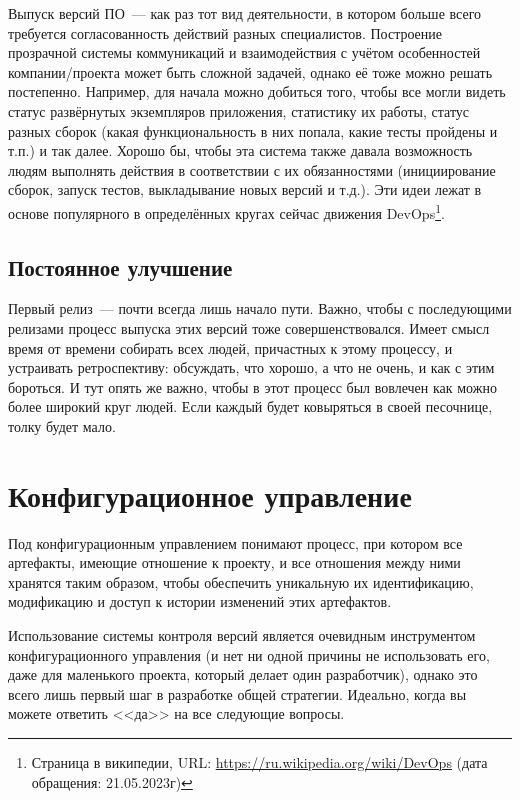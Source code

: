 \documentclass{../../text-style}
\begin{document}
Выпуск версий ПО~--- как раз тот вид деятельности, в котором больше всего требуется согласованность действий разных специалистов. Построение прозрачной системы коммуникаций и взаимодействия с учётом особенностей компании/проекта может быть сложной задачей, однако её тоже можно решать постепенно. Например, для начала можно добиться того, чтобы все могли видеть статус развёрнутых экземпляров приложения, статистику их работы, статус разных сборок (какая функциональность в них попала, какие тесты пройдены и т.п.) и так далее. Хорошо бы, чтобы эта система также давала возможность людям выполнять действия в соответствии с их обязанностями (инициирование сборок, запуск тестов, выкладывание новых версий и т.д.). Эти идеи лежат в основе популярного в определённых кругах сейчас движения DevOps\footnote{Страница в википедии, URL: \url{https://ru.wikipedia.org/wiki/DevOps} (дата обращения: 21.05.2023г)}.

\subsection{Постоянное улучшение}

Первый релиз~--- почти всегда лишь начало пути. Важно, чтобы с последующими релизами процесс выпуска этих версий тоже совершенствовался. Имеет смысл время от времени собирать всех людей, причастных к этому процессу, и устраивать ретроспективу: обсуждать, что хорошо, а что не очень, и как с этим бороться. И тут опять же важно, чтобы в этот процесс был вовлечен как можно более широкий круг людей. Если каждый будет ковыряться в своей песочнице, толку будет мало.

\section{Конфигурационное управление}

Под конфигурационным управлением понимают процесс, при котором все артефакты, имеющие отношение к проекту, и все отношения между ними хранятся таким образом, чтобы обеспечить уникальную их идентификацию, модификацию и доступ к истории изменений этих артефактов.

Использование системы контроля версий является очевидным инструментом конфигурационного управления (и нет ни одной причины не использовать его, даже для маленького проекта, который делает один разработчик), однако это всего лишь первый шаг в разработке общей стратегии. Идеально, когда вы можете ответить <<да>> на все следующие вопросы.
\end{document}
